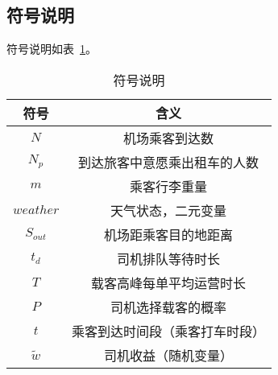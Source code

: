 \subsection{符号说明}
符号说明如表~\ref{T:symbols}。
\begin{table}
    \centering
    \begin{tabular}{@{}cc@{}}
    \toprule
    符号          & 含义              \\ \midrule
    \rowcolor[HTML]{EFEFEF} 
    $N$         & 机场乘客到达数         \\
    $N_p$       & 到达旅客中意愿乘出租车的人数  \\
    \rowcolor[HTML]{EFEFEF} 
    $m$         & 乘客行李重量          \\
    $weather$    & 天气状态，二元变量            \\
    \rowcolor[HTML]{EFEFEF} 
    $S_{out}$   & 机场距乘客目的地距离      \\
    $t_{d}$     & 司机排队等待时长        \\
    \rowcolor[HTML]{EFEFEF} 
    $T$         & 载客高峰每单平均运营时长    \\
    $P$         & 司机选择载客的概率       \\
    \rowcolor[HTML]{EFEFEF} 
    $t$         & 乘客到达时间段（乘客打车时段） \\
    $\tilde{w}$ & 司机收益（随机变量）      \\ \bottomrule
    \end{tabular}
    \caption{符号说明}\label{T:symbols}
\end{table}
